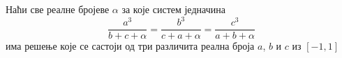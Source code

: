 \problem
Наћи све реалне бројеве $\alpha$ за које систем једначина 
\[
    \frac{a^3}{b + c + \alpha}
=
    \frac{b^3}{c + a + \alpha}
=
    \frac{c^3}{a + b + \alpha}
\]
има решење које се састоји од три различита реална броја $a$, $b$ и $c$ из
$[-1, 1]$

\solution

\endproblem

